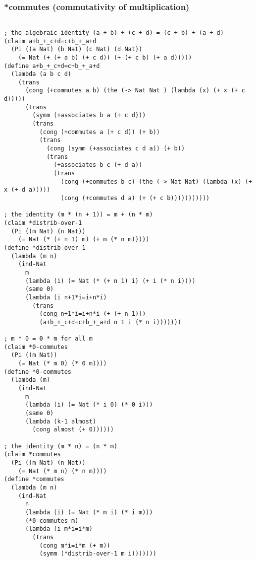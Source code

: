 \subsubsection{*commutes (commutativity of multiplication)} \label{code:*commutes}
\begin{verbatim}

; the algebraic identity (a + b) + (c + d) = (c + b) + (a + d)
(claim a+b_+_c+d=c+b_+_a+d
  (Pi ((a Nat) (b Nat) (c Nat) (d Nat))
    (= Nat (+ (+ a b) (+ c d)) (+ (+ c b) (+ a d)))))
(define a+b_+_c+d=c+b_+_a+d
  (lambda (a b c d)
    (trans
      (cong (+commutes a b) (the (-> Nat Nat ) (lambda (x) (+ x (+ c d)))))
      (trans
        (symm (+associates b a (+ c d)))
        (trans
          (cong (+commutes a (+ c d)) (+ b))
          (trans
            (cong (symm (+associates c d a)) (+ b))
            (trans
              (+associates b c (+ d a))
              (trans
                (cong (+commutes b c) (the (-> Nat Nat) (lambda (x) (+ x (+ d a)))))
                (cong (+commutes d a) (+ (+ c b)))))))))))

; the identity (m * (n + 1)) = m + (n * m)
(claim *distrib-over-1
  (Pi ((m Nat) (n Nat))
    (= Nat (* (+ n 1) m) (+ m (* n m)))))
(define *distrib-over-1
  (lambda (m n)
    (ind-Nat
      m
      (lambda (i) (= Nat (* (+ n 1) i) (+ i (* n i))))
      (same 0)
      (lambda (i n+1*i=i+n*i)
        (trans
          (cong n+1*i=i+n*i (+ (+ n 1)))
          (a+b_+_c+d=c+b_+_a+d n 1 i (* n i)))))))

; m * 0 = 0 * m for all m
(claim *0-commutes
  (Pi ((m Nat))
    (= Nat (* m 0) (* 0 m))))
(define *0-commutes
  (lambda (m)
    (ind-Nat
      m
      (lambda (i) (= Nat (* i 0) (* 0 i)))
      (same 0)
      (lambda (k-1 almost)
        (cong almost (+ 0))))))

; the identity (m * n) = (n * m)
(claim *commutes
  (Pi ((m Nat) (n Nat))
    (= Nat (* m n) (* n m))))
(define *commutes
  (lambda (m n)
    (ind-Nat
      n
      (lambda (i) (= Nat (* m i) (* i m)))
      (*0-commutes m)
      (lambda (i m*i=i*m)
        (trans
          (cong m*i=i*m (+ m))
          (symm (*distrib-over-1 m i)))))))
\end{verbatim}

